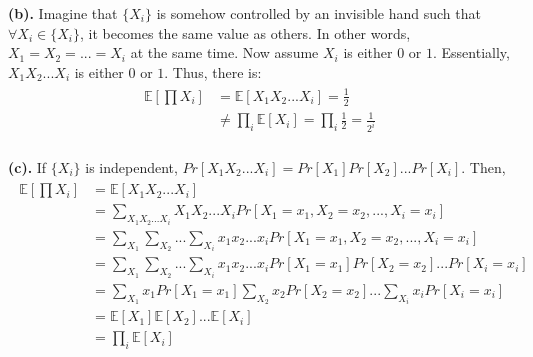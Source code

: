 \documentclass[titlepage, paper=a4, fontsize=11pt]{scrartcl} %
\numberwithin{equation}{section} %
\numberwithin{figure}{section} %
\numberwithin{table}{section} %
\begin{document}
\textbf{(b).}
Imagine that $\{X_i\}$ is somehow controlled by an invisible hand such that
$\forall X_i \in \{X_i\}$, it becomes the same value as others.
In other words, $X_1=X_2= ... =X_i$ at the same time.
Now assume $X_i$ is either $0$ or $1$. Essentially, $X_1X_2...X_i$ is either $0$ or $1$.
Thus, there is:
\begin{align*} 
\begin{split}
\mathbb{E}[\prod X_i] &= \mathbb{E}[X_1X_2...X_i] = \frac{1}{2} \\
&\neq \prod_i \mathbb{E}[X_i] = \prod_i \frac{1}{2} = \frac{1}{2^i}
\end{split}					
\end{align*}
\\

\textbf{(c).}
If $\{X_i\}$ is independent, $Pr[X_1X_2...X_i]=Pr[X_1]Pr[X_2]...Pr[X_i]$.
Then,
\begin{align*} 
\begin{split}
\mathbb{E}[\prod X_i] &= \mathbb{E}[X_1X_2...X_i] \\
&= \sum_{X_1X_2...X_i} X_1X_2...X_iPr[X_1=x_1,X_2=x_2, ... ,X_i=x_i] \\
&= \sum_{X_1}\sum_{X_2}...\sum_{X_i} x_1x_2...x_iPr[X_1=x_1,X_2=x_2, ... ,X_i=x_i] \\
&= \sum_{X_1}\sum_{X_2}...\sum_{X_i} x_1x_2...x_iPr[X_1=x_1]Pr[X_2=x_2]...Pr[X_i=x_i] \\
&= \sum_{X_1}x_1Pr[X_1=x_1]\sum_{X_2}x_2Pr[X_2=x_2]...\sum_{X_i}x_iPr[X_i=x_i] \\
&= \mathbb{E}[X_1]\mathbb{E}[X_2]...\mathbb{E}[X_i] \\
&= \prod_i \mathbb{E}[X_i]
\end{split}					
\end{align*}
\\



\end{document}
